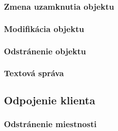 \subsubsection{Zmena uzamknutia objektu}

\subsubsection{Modifikácia objektu}

\subsubsection{Odstránenie objektu}

\subsubsection{Textová správa}


\subsection{Odpojenie klienta}

\subsubsection{Odstránenie miestnosti}
